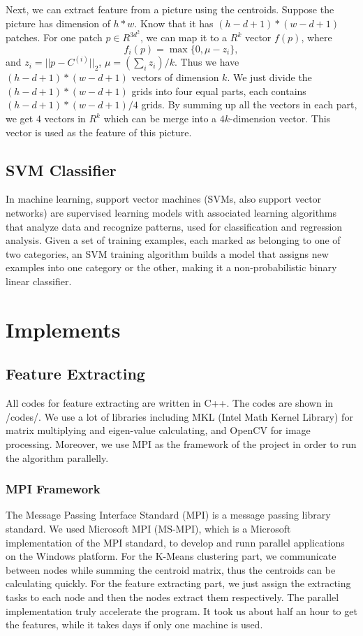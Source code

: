 \documentclass[12pt,abstract=true]{scrartcl}
\numberwithin{equation}{section}
\theoremstyle{definition}   \newtheorem{definition}{Definition}[section]
\theoremstyle{plain}        \newtheorem{theorem}{Theorem}[section]
\theoremstyle{plain}        \newtheorem{observation}{Observation}[section]
\theoremstyle{plain}        \newtheorem{fact}{Fact}[section]
\theoremstyle{plain}        \newtheorem{claim}{Claim}[section]
\theoremstyle{plain}        \newtheorem{lemma}[theorem]{Lemma}
\theoremstyle{plain}        \newtheorem{corollary}[theorem]{Corollary}
\theoremstyle{remark}       \newtheorem{example}{Example}[section]
\theoremstyle{remark}       \newtheorem{remark}{Remark}[section]
\begin{document}
		Next, we can extract feature from a picture using the centroids.
		Suppose the picture has dimension of $h*w$.
		Know that it has $(h-d+1)*(w-d+1)$ patches.
		For one patch $p\in R^{3d^2}$, we can map it to a $R^k$ vector $f(p)$,
		where
			$$ f_i(p) = \max \{0, \mu - z_i\}, $$
		and $z_i = ||p-C^{(i)}||_2$, $\mu = (\sum_i z_i) / k$.
		Thus we have $(h-d+1)*(w-d+1)$ vectors of dimension $k$.
		We just divide the $(h-d+1)*(w-d+1)$ grids into four equal parts,
			each contains $(h-d+1)*(w-d+1)/4$ grids.
		By summing up all the vectors in each part,
			we get $4$ vectors in $R^k$ which can be merge into a $4k$-dimension vector.
		This vector is used as the feature of this picture.
	
	\subsection{SVM Classifier}
		In machine learning, support vector machines (SVMs, also support vector networks) are supervised learning models with associated learning algorithms
        that analyze data and recognize patterns, used for classification and regression analysis. Given a set of training examples, each marked as belonging to one of two categories, an SVM training algorithm builds a model that assigns new examples into one category or the other, making it a non-probabilistic binary linear classifier.

\section{Implements}
    
	\subsection{Feature Extracting}
		All codes for feature extracting are written in C++.
		The codes are shown in /codes/.
		We use a lot of libraries including MKL (Intel Math Kernel Library)
			for matrix multiplying and eigen-value calculating,
			and OpenCV for image processing.
		Moreover, we use MPI as the framework of the project
			in order to run the algorithm parallelly.
		
		\subsubsection{MPI Framework}
			The Message Passing Interface Standard (MPI) is a message passing library standard.
			We used Microsoft MPI (MS-MPI),
				which is a Microsoft implementation of the MPI standard,
				to develop and runn parallel applications on the Windows platform.
			For the K-Means clustering part,
				we communicate between nodes while summing the centroid matrix,
				thus the centroids can be calculating quickly.
			For the feature extracting part,
				we just assign the extracting tasks to each node
				and then the nodes extract them respectively.
			The parallel implementation truly accelerate the program.
			It took us about half an hour to get the features,
				while it takes days if only one machine is used.
		
\end{document}
